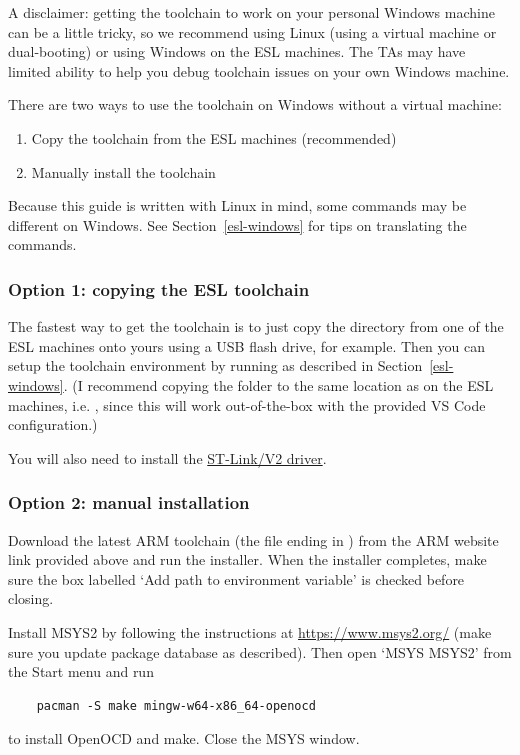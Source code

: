 A disclaimer: getting the toolchain to work on your personal Windows machine
can be a little tricky, so we recommend using Linux (using a virtual machine
or dual-booting) or using Windows on the ESL machines. The TAs may have
limited ability to help you debug toolchain issues on your own Windows
machine.

There are two ways to use the toolchain on Windows without a virtual machine:
\begin{enumerate}
  \item Copy the toolchain from the ESL machines (recommended)
  \item Manually install the toolchain
\end{enumerate}

Because this guide is written with Linux in mind, some commands may be
different on Windows. See Section~\ref{esl-windows} for tips on translating
the commands.

\subsubsection{Option 1: copying the ESL toolchain}

The fastest way to get the toolchain is to just copy the
 directory from one of the ESL machines onto
yours using a USB flash drive, for example. Then you can setup the toolchain
environment by running
as described in Section~\ref{esl-windows}. (I recommend copying the folder to
the same location as on the ESL machines, i.e. ,
since this will work out-of-the-box with the provided VS Code configuration.)

You will also need to install the
\href{https://www.st.com/en/development-tools/stsw-link009.html}{ST-Link/V2
driver}.

\subsubsection{Option 2: manual installation}

Download the latest ARM toolchain (the file ending in
) from the ARM website link
provided above and run the installer. When the installer completes, make sure
the box labelled `Add path to environment variable' is checked before closing.

Install MSYS2 by following the instructions at \url{https://www.msys2.org/}
(make sure you update package database as described). Then open `MSYS MSYS2'
from the Start menu and run
\begin{verbatim}
    pacman -S make mingw-w64-x86_64-openocd
\end{verbatim}
to install OpenOCD and make. Close the MSYS window.

